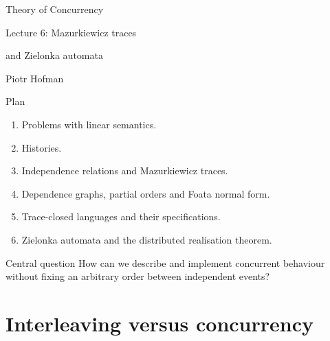 \documentclass[t,11pt]{beamer}
\begin{document}
\begin{frame}[plain]
  \vspace{1.10cm}
  \begin{center}
    {\huge\color{LectureBlue} Theory of Concurrency\par}
    \vspace{0.55cm}
    {\Large Lecture 6: Mazurkiewicz traces\par}
    \vspace{0.17cm}
    {\Large and Zielonka automata\par}
    \vspace{0.94cm}
    {\large Piotr Hofman\par}
  \end{center}
\end{frame}

\begin{frame}{Plan}
  \begin{enumerate}
    \item Problems with linear semantics.
    \item Histories.
    \item Independence relations and Mazurkiewicz traces.
    \item Dependence graphs, partial orders and Foata normal form.
    \item Trace-closed languages and their specifications.
    \item Zielonka automata and the distributed realisation theorem.
  \end{enumerate}
  \vspace{0.4cm}
  \begin{block}{Central question}
    How can we describe and implement concurrent behaviour without fixing an arbitrary order between independent events?
  \end{block}
\end{frame}


\section{Interleaving versus concurrency}
\end{document}
